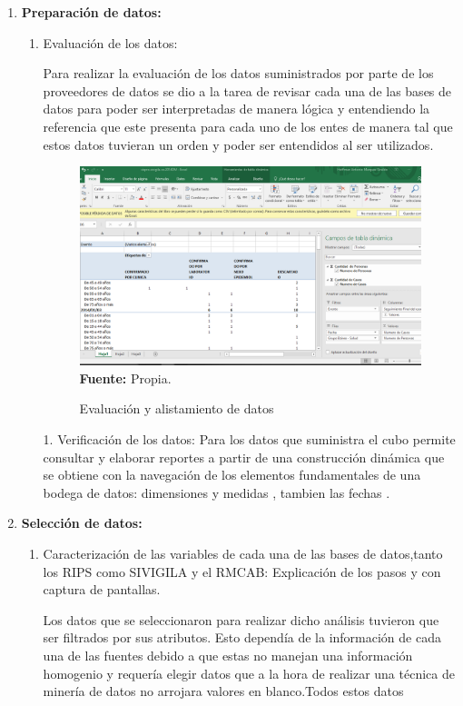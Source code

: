 \documentclass[a4paper,openright,12pt]{book}
\theoremstyle{definition}
\theoremstyle{remark}
\begin{document}
\begin{enumerate}
	\item \textbf{Preparación de datos:}
    \begin{enumerate}
		\item Evaluación de los datos:

Para realizar la evaluación de los datos suministrados por parte de los proveedores de datos se  dio a la tarea de revisar cada una de las bases de datos para poder ser interpretadas de manera lógica y entendiendo la referencia que este presenta para cada uno de los entes  de manera tal que  estos datos tuvieran un orden y poder ser entendidos al ser utilizados.

\begin{figure}[ht]
\centering
\caption{Evaluación y alistamiento de datos} 
\includegraphics[scale=0.3]{DatoCsv}
\label{fig:1_OpenSSL}
\\ \textbf{Fuente:} Propia.
\end{figure}

    	1. Verificación de los datos:
        Para los datos que suministra el cubo permite consultar y elaborar reportes a partir de una construcción dinámica que se obtiene con la navegación de los elementos fundamentales de una bodega de datos: dimensiones y medidas , tambien las fechas .
	\end{enumerate}
    \item \textbf{Selección de datos:}
    \begin{enumerate}
		\item Caracterización de  las variables de cada una de las bases de datos,tanto los RIPS como SIVIGILA y el RMCAB: Explicación de los pasos y con captura de pantallas.
        
Los datos que se seleccionaron para realizar dicho análisis tuvieron que ser filtrados por sus atributos. Esto dependía de la información  de cada una de las fuentes debido a que estas no manejan una información homogenio y requería elegir datos que a la hora de realizar una técnica de minería de datos no arrojara valores en blanco.Todos estos datos 



\end{enumerate}
\end{enumerate}
\end{document}
